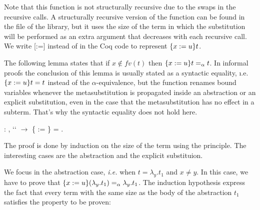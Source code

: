 Note that this function is not structurally recursive due to the swaps in the recursive calls. A structurally recursive version of the function  can be found in the file  of the  library\cite{metalib}, but it uses the size of the term in which the substitution will be performed as an extra argument that decreases with each recursive call. We write [:=] instead of     in the Coq code to represent $\metasub{t}{x}{u}$.
\begin{coqdoccode}
\coqdocemptyline
\end{coqdoccode}
The following lemma states that if $x \notin fv(t)$ then $\metasub{t}{x}{u} =_\alpha t$. In informal proofs the conclusion of this lemma is usually stated as a syntactic equality, {\i.e.} $\metasub{t}{x}{u} = t$ instead of the $\alpha$-equivalence, but the function  renames bound variables whenever the metasubstitution is propagated inside an abstraction or an explicit substitution, even in the case that the metasubstitution has no effect in a subterm. That's why the syntactic equality does not hold here. 
\begin{coqdoccode}
\coqdocemptyline
\coqdocnoindent
{} : \coqdockw{\ensuremath{\forall}}   ,  ``   \ensuremath{\rightarrow} \{ := \} = .\coqdoceol
\end{coqdoccode}
 The proof is done by induction on the size of the term  using the  principle. The interesting cases are the abstraction and the explicit substituion.
\begin{coqdoccode}
\end{coqdoccode}
We focus in the abstraction case, {\it i.e.} when $t = \lambda_y.t_1$ and $x \neq y$. In this case, we have to prove that $\metasub{(\lambda_y.t_1)}{x}{u} =_\alpha \lambda_y.t_1$. The induction hypothesis express the fact that every term with the same size as the body of the abstraction $t_1$ satisfies the property to be proven:


